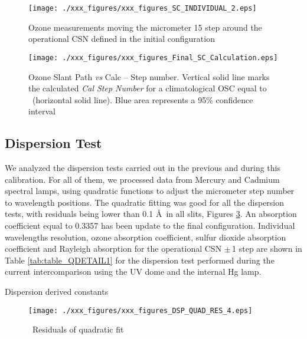 \begin{figure}[hbtp!]
\begin{center}
		\texttt{[image: ./xxx\_figures/xxx\_figures\_SC\_INDIVIDUAL\_2.eps]}
		\caption{Ozone measurements moving the micrometer 15 step around the operational CSN defined in the initial configuration}
		\label{fig:xxx_figures_SC_INDIVIDUAL}
\end{center}
\end{figure}

\begin{figure}[hbtp!]
\begin{center}
\texttt{[image: ./xxx\_figures/xxx\_figures\_Final\_SC\_Calculation.eps]}
  \caption{Ozone Slant Path \emph{vs} Calc -- Step number. Vertical solid line marks the calculated \emph{Cal Step Number} for a climatological OSC equal to \textbf{\STATIONOSC}\ (horizontal solid line). Blue area represents a 95\% confidence interval}
\label{fig:Final_SC_Calculation}

\end{center}
\end{figure}

\newpage
\subsection{Dispersion Test} \label{subsec:DSP}
We analyzed the dispersion tests carried out in the previous and during this calibration. For all of them, we processed data from Mercury and Cadmium spectral lamps, using quadratic functions to adjust the micrometer step number to wavelength positions.
The quadratic fitting was good for all the dispersion tests, with residuals being lower than 0.1 \AA\ in all slits, Figures \ref{fig:DSP_QUAD_RES_1}. An absorption coefficient equal to 0.3357 has been update to the final configuration.
Individual wavelengths resolution, ozone absorption coefficient, sulfur dioxide absorption coefficient and Rayleigh absorption for the operational CSN $\pm$\,1 step are shown in Table \ref{tab:table_QDETAIL1} for the dispersion test performed during the current intercomparison using the UV dome and the internal Hg lamp. 

\begin{table}[b] 
\centering
		\caption{Dispersion derived constants}
		\label{tab:table_dsp}
			
\end{table}

\begin{figure}[hbtp!]
\begin{center}
		\texttt{[image: ./xxx\_figures/xxx\_figures\_DSP\_QUAD\_RES\_4.eps]}
		\caption{\calyear\ Residuals of quadratic fit}
		\label{fig:DSP_QUAD_RES_1}
\end{center}
\end{figure}

